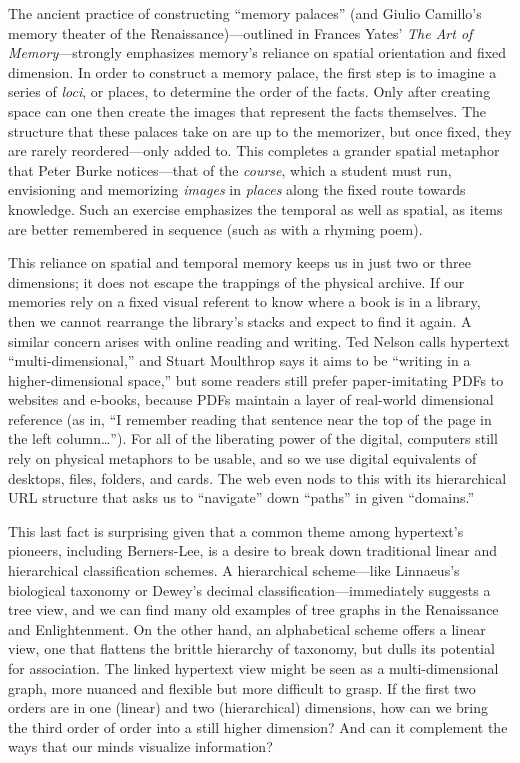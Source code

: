 The ancient practice of constructing ``memory palaces'' (and Giulio Camillo's memory theater of the Renaissance)---outlined in Frances Yates' \emph{The Art of Memory}---strongly emphasizes memory's reliance on spatial orientation and fixed dimension.\autocite{yates_art_1966} In order to construct a memory palace, the first step is to imagine a series of \emph{loci}, or places, to determine the order of the facts. Only after creating space can one then create the images that represent the facts themselves. The structure that these palaces take on are up to the memorizer, but once fixed, they are rarely reordered---only added to. This completes a grander spatial metaphor that Peter Burke notices---that of the \emph{course}, which a student must run, envisioning and memorizing \emph{images} in \emph{places} along the fixed route towards knowledge.\autocite[90]{burke_social_2000} Such an exercise emphasizes the temporal as well as spatial, as items are better remembered in sequence (such as with a rhyming poem).

This reliance on spatial and temporal memory keeps us in just two or three dimensions; it does not escape the trappings of the physical archive. If our memories rely on a fixed visual referent to know where a book is in a library, then we cannot rearrange the library's stacks and expect to find it again. A similar concern arises with online reading and writing. Ted Nelson calls hypertext ``multi-dimensional,'' and Stuart Moulthrop says it aims to be ``writing in a higher-dimensional space,''\autocite{barnet_mandelbrot_2013} but some readers still prefer paper-imitating PDFs to websites and e-books, because PDFs maintain a layer of real-world dimensional reference (as in, ``I remember reading that sentence near the top of the page in the left column\ldots''). For all of the liberating power of the digital, computers still rely on physical metaphors to be usable, and so we use digital equivalents of desktops, files, folders, and cards. The web even nods to this with its hierarchical URL structure that asks us to ``navigate'' down ``paths'' in given ``domains.''

This last fact is surprising given that a common theme among hypertext's pioneers, including Berners-Lee, is a desire to break down traditional linear and hierarchical classification schemes. A hierarchical scheme---like Linnaeus's biological taxonomy or Dewey's decimal classification---immediately suggests a tree view, and we can find many old examples of tree graphs in the Renaissance and Enlightenment. On the other hand, an alphabetical scheme offers a linear view, one that flattens the brittle hierarchy of taxonomy, but dulls its potential for association. The linked hypertext view might be seen as a multi-dimensional graph, more nuanced and flexible but more difficult to grasp. If the first two orders are in one (linear) and two (hierarchical) dimensions, how can we bring the third order of order into a still higher dimension? And can it complement the ways that our minds visualize information?


